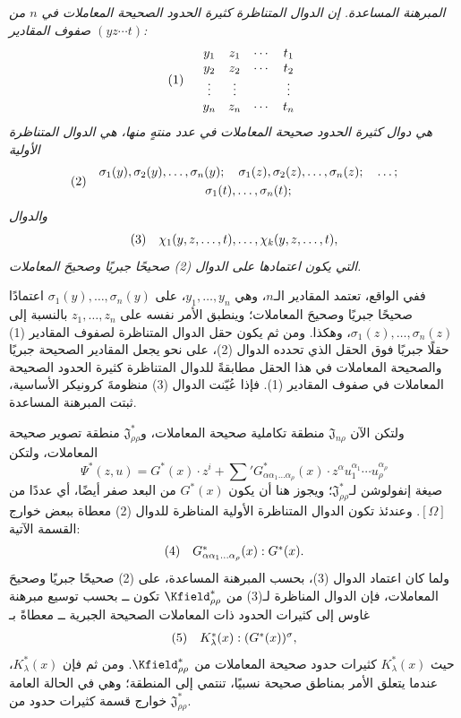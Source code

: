 \documentclass[11pt]{article}
\providecommand{\Jdom}{\mathfrak{J}}
\begin{document}
\emph{المبرهنة المساعدة. إن الدوال المتناظرة كثيرة الحدود الصحيحة المعاملات في $n$ من صفوف المقادير $(yz\cdots t)$:}
\[
\begin{array}{@{}l@{\quad}c@{}}
(1)&
\begin{array}{cccc}
  y_1&z_1&\cdots&t_1\\
  y_2&z_2&\cdots&t_2\\
  \vdots&\vdots&&\vdots\\
  y_n&z_n&\cdots&t_n
\end{array}
\end{array}
\]
\emph{هي دوال كثيرة الحدود صحيحة المعاملات في عدد منتهٍ منها، هي الدوال المتناظرة الأولية}
\[
\begin{array}{@{}l@{\quad}c@{}}
(2)&
\begin{gathered}
  \sigma_1(y),\sigma_2(y),\ldots,\sigma_n(y);\quad
  \sigma_1(z),\sigma_2(z),\ldots,\sigma_n(z);\quad\ldots;\\
  \sigma_1(t),\ldots,\sigma_n(t);
\end{gathered}
\end{array}
\]
\emph{والدوال}
\[
\begin{array}{@{}l@{\quad}c@{}}
(3)&
  \chi_1(y,z,\ldots,t),\ldots,\chi_k(y,z,\ldots,t),
\end{array}
\]
\emph{التي يكون اعتمادها على الدوال (2) صحيحًا جبريًا وصحيحَ المعاملات.}

ففي الواقع، تعتمد المقادير الـ$n$، وهي $y_1,
\ldots,y_n$، على $\sigma_1(y),
\ldots,\sigma_n(y)$ اعتمادًا صحيحًا جبريًا وصحيحَ المعاملات؛ وينطبق الأمر نفسه على $z_1,
\ldots,z_n$ بالنسبة إلى $\sigma_1(z),
\ldots,\sigma_n(z)$، وهكذا. ومن ثم يكون حقل الدوال المتناظرة لصفوف المقادير (1) حقلًا جبريًا فوق الحقل الذي تحدده الدوال (2)، على نحو يجعل المقادير الصحيحة جبريًا والصحيحة المعاملات في هذا الحقل مطابقةً للدوال المتناظرة كثيرة الحدود الصحيحة المعاملات في صفوف المقادير (1). فإذا عُيّنت الدوال (3) منظومةَ كرونيكر الأساسية، ثبتت المبرهنة المساعدة.

ولتكن الآن $\Jdom_{n\rho}$ منطقة تكاملية صحيحة المعاملات، و$\Jdom^*_{\rho\rho}$ منطقة تصوير صحيحة المعاملات، ولتكن
\[
  \Psi^*(z,u)=G^*(x)\cdot z^i+
  \sum{}'G^*_{\alpha\alpha_1\ldots\alpha_\rho}(x)\cdot
  z^\alpha u_1^{\alpha_1}\cdots u_\rho^{\alpha_\rho}
\]
صيغة إنفولوشن لـ$\Jdom^*_{\rho\rho}$؛ ويجوز هنا أن يكون $G^*(x)$ من البعد صفر أيضًا، أي عددًا من $[\Omega]$. وعندئذ تكون الدوال المتناظرة الأولية المناظرة للدوال (2) معطاة ببعض خوارج القسمة الآتية:
\[
\begin{array}{@{}l@{\quad}c@{}}
(4)&
  G^*_{\alpha\alpha_1\ldots\alpha_\rho}(x):G^*(x).
\end{array}
\]
ولما كان اعتماد الدوال (3)، بحسب المبرهنة المساعدة، على (2) صحيحًا جبريًا وصحيحَ المعاملات، فإن الدوال المناظرة لـ(3) من $\Kfield^*_{\rho\rho}$ تكون ــ بحسب توسيع مبرهنة غاوس إلى كثيرات الحدود ذات المعاملات الصحيحة الجبرية ــ معطاةً بـ
\[
\begin{array}{@{}l@{\quad}c@{}}
(5)&
  K_\lambda^*(x):(G^*(x))^\sigma,
\end{array}
\]
حيث $K_\lambda^*(x)$ كثيرات حدود صحيحة المعاملات من $\Kfield^*_{\rho\rho}$. ومن ثم فإن $K_\lambda^*(x)$، عندما يتعلق الأمر بمناطق صحيحة نسبيًا، تنتمي إلى المنطقة؛ وهي في الحالة العامة خوارج قسمة كثيرات حدود من $\Jdom^*_{\rho\rho}$.
\end{document}
